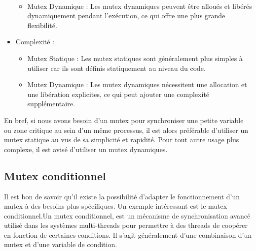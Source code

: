 \begin{itemize}
\begin{itemize}
        \\
        \item Mutex Dynamique : Les mutex dynamiques peuvent être alloués et libérés dynamiquement pendant l'exécution, ce qui offre une plus grande flexibilité.
    \end{itemize}
\vspace{\baselineskip}
    \item Complexité :
    \vspace{\baselineskip}
    \begin{itemize}
        \item Mutex Statique : Les mutex statiques sont généralement plus simples à utiliser car ils sont définis statiquement au niveau du code.
        \\
        \item Mutex Dynamique : Les mutex dynamiques nécessitent une allocation et une libération explicites, ce qui peut ajouter une complexité supplémentaire.
    \end{itemize}
\end{itemize}
\vspace{\baselineskip}

En bref, si nous avons besoin d'un mutex pour synchroniser une petite variable ou zone critique au sein d'un même processus, il est alors préférable d'utiliser un mutex statique au vus de sa simplicité et rapidité. Pour tout autre usage plus complexe, il est avisé d'utiliser un mutex dynamiques.





\subsection{Mutex conditionnel}

Il est bon de savoir qu'il existe la possibilité d'adapter le fonctionnement d'un mutex à des besoins plus spécifiques. Un exemple intéressant est le mutex conditionnel.Un mutex conditionnel, est un mécanisme de synchronisation avancé utilisé dans les systèmes multi-threads pour permettre à des threads de coopérer en fonction de certaines conditions. Il s'agit généralement d'une combinaison d'un mutex et d'une variable de condition.
\\


